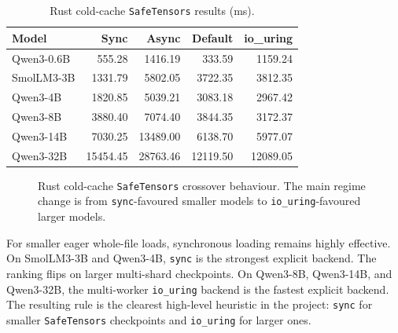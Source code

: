 \begin{table}[h]
\caption{Rust cold-cache \texttt{SafeTensors} results (ms).}
\label{tab:rust-safetensors}
\centering
\begin{tabular}{lrrrr}
\toprule
Model & Sync & Async & Default & io\_uring \\
\midrule
Qwen3-0.6B & 555.28 & 1416.19 & 333.59 & 1159.24 \\
SmolLM3-3B & 1331.79 & 5802.05 & 3722.35 & 3812.35 \\
Qwen3-4B & 1820.85 & 5039.21 & 3083.18 & 2967.42 \\
Qwen3-8B & 3880.40 & 7074.40 & 3844.35 & 3172.37 \\
Qwen3-14B & 7030.25 & 13489.00 & 6138.70 & 5977.07 \\
Qwen3-32B & 15454.45 & 28763.46 & 12119.50 & 12089.05 \\
\bottomrule
\end{tabular}
\end{table}

\begin{figure}[h]
\centering
{}
\caption{Rust cold-cache \texttt{SafeTensors} crossover behaviour. The main regime change is from \texttt{sync}-favoured smaller models to \texttt{io\_uring}-favoured larger models.}
\label{fig:rust-safetensors-crossover}
\end{figure}

For smaller eager whole-file loads, synchronous loading remains highly effective. On SmolLM3-3B and Qwen3-4B, \texttt{sync} is the strongest explicit backend. The ranking flips on larger multi-shard checkpoints. On Qwen3-8B, Qwen3-14B, and Qwen3-32B, the multi-worker \texttt{io\_uring} backend is the fastest explicit backend. The resulting rule is the clearest high-level heuristic in the project: \texttt{sync} for smaller \texttt{SafeTensors} checkpoints and \texttt{io\_uring} for larger ones.

